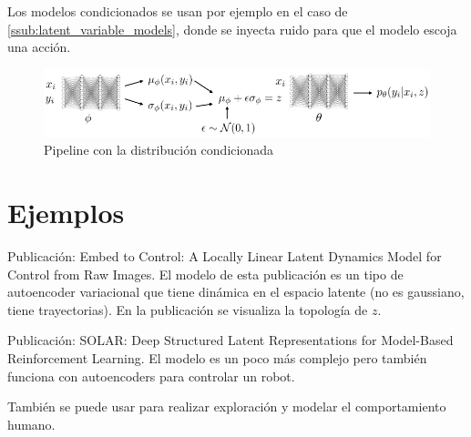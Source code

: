 Los modelos condicionados se usan por ejemplo en el caso de
\ref{ssub:latent_variable_models}, donde se inyecta ruido para que el modelo escoja una acción.

\begin{figure}[H]
	\centering
	\includegraphics[width=0.8\linewidth]{figures/2020-07-01-234639_821x145_scrot.png}
	\caption{Pipeline con la distribución condicionada}
    \label{fig:pipeline_condicionado}
\end{figure}

\section{Ejemplos}%
\label{sec:ejemplos}

Publicación: Embed to Control: A Locally Linear Latent Dynamics Model for Control from Raw
Images. El modelo de esta publicación es un tipo de autoencoder variacional que tiene dinámica
en el espacio latente (no es gaussiano, tiene trayectorias). En la publicación se
visualiza la topología de $z$.

Publicación: SOLAR: Deep Structured Latent Representations for Model-Based Reinforcement
Learning. El modelo es un poco más complejo pero también funciona con autoencoders para
controlar un robot.

También se puede usar para realizar exploración y modelar el comportamiento humano.
